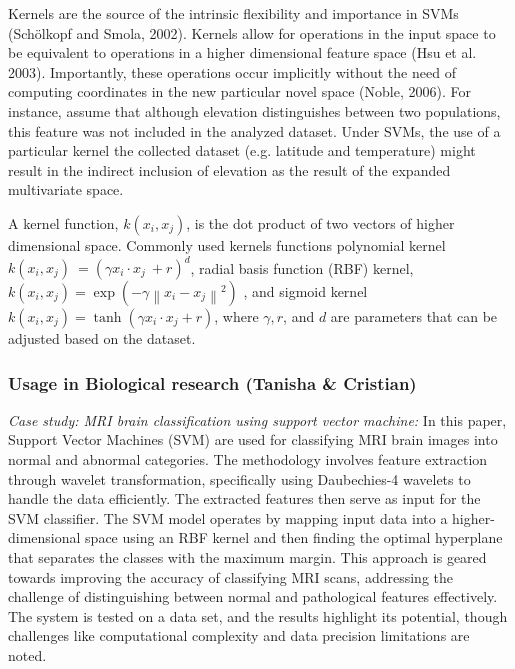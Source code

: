 Kernels are the source of the intrinsic flexibility and importance
in SVMs (Schölkopf and Smola, 2002). Kernels allow for operations in the
input space to be equivalent to operations in a higher dimensional
feature space (Hsu et al. 2003). Importantly, these operations occur
implicitly without the need of computing coordinates in the new
particular novel space (Noble, 2006). For instance, assume that although
elevation distinguishes between two populations, this feature was not
included in the analyzed dataset. Under SVMs, the use of a particular
kernel the collected dataset (e.g. latitude and temperature) might
result in the indirect inclusion of elevation as the result of the
expanded multivariate space.

A kernel function, $k\left( x_{i},x_{j} \right)$, is the dot product of two vectors of higher dimensional space.  Commonly used kernels functions polynomial kernel $k\left( x_{i},x_{j} \right)\  = \left( \gamma x_{i} \cdot x_{j}\  + r \right)^{d}$,
radial basis function (RBF) kernel,
$k\left( x_{i},x_{j} \right) = \exp\left( - \gamma\left\| x_{i} - x_{j}\right \|^{2} \right)$
,
and sigmoid kernel
$k\left( x_{i},x_{j} \right) = \tanh\left( \gamma x_{i} \cdot x_{j} + r \right)$,
where
 $\gamma, r$,  and $d$
are parameters that can be
adjusted based on the dataset.

\subsubsection{Usage in Biological research (Tanisha \& Cristian)}


\emph{Case study: MRI brain classification using support vector
machine:} In this paper, Support Vector Machines (SVM) are used for
classifying MRI brain images into normal and abnormal categories. The
methodology involves feature extraction through wavelet transformation,
specifically using Daubechies-4 wavelets to handle the data efficiently.
The extracted features then serve as input for the SVM classifier. The
SVM model operates by mapping input data into a higher-dimensional space
using an RBF kernel and then finding the optimal hyperplane that
separates the classes with the maximum margin. This approach is geared
towards improving the accuracy of classifying MRI scans, addressing the
challenge of distinguishing between normal and pathological features
effectively. The system is tested on a data set, and the results
highlight its potential, though challenges like computational complexity
and data precision limitations are noted.

